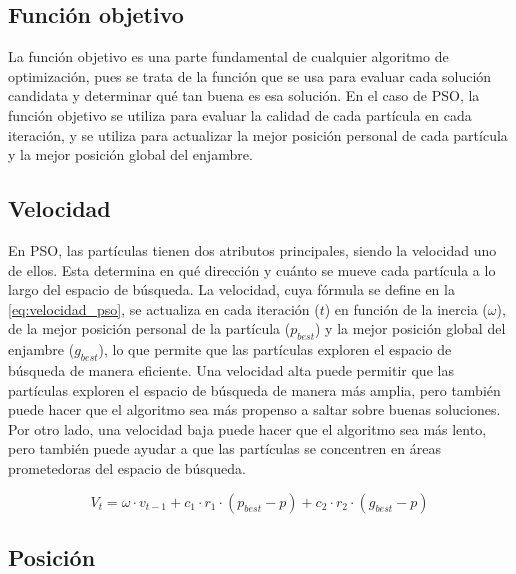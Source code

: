 
\subsection{Función objetivo}

La función objetivo es una parte fundamental de cualquier algoritmo de optimización, pues se trata de la función que se usa para evaluar cada solución candidata y determinar qué tan buena es esa solución. En el caso de PSO, la función objetivo se utiliza para evaluar la calidad de cada partícula en cada iteración, y se utiliza para actualizar la mejor posición personal de cada partícula y la mejor posición global del enjambre.

\subsection{Velocidad}

En PSO, las partículas tienen dos atributos principales, siendo la velocidad uno de ellos. Esta determina en qué dirección y cuánto se mueve cada partícula a lo largo del espacio de búsqueda. La velocidad, cuya fórmula se define en la \autoref{eq:velocidad_pso}, se actualiza en cada iteración ($t$) en función de la inercia ($\omega$), de la mejor posición personal de la partícula ($p_{best}$) y la mejor posición global del enjambre ($g_{best}$), lo que permite que las partículas exploren el espacio de búsqueda de manera eficiente. Una velocidad alta puede permitir que las partículas exploren el espacio de búsqueda de manera más amplia, pero también puede hacer que el algoritmo sea más propenso a saltar sobre buenas soluciones. Por otro lado, una velocidad baja puede hacer que el algoritmo sea más lento, pero también puede ayudar a que las partículas se concentren en áreas prometedoras del espacio de búsqueda.

\begin{equation}\label{eq:velocidad_pso}
    V_t = \omega \cdot v_{t-1} + c_1 \cdot r_1 \cdot (p_{best} - p) + c_2 \cdot r_2 \cdot (g_{best} - p)
\end{equation}

\subsection{Posición}

